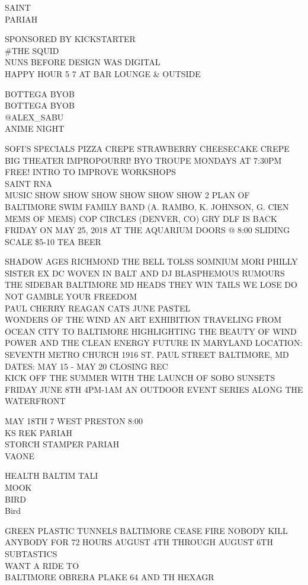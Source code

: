 \documentclass[10pt,letterpaper]{article}
\begin{document}
SAINT\\
PARIAH

SPONSORED BY KICKSTARTER\\
\#THE SQUID\\
NUNS BEFORE DESIGN WAS DIGITAL\\
HAPPY HOUR 5 7 AT BAR LOUNGE \& OUTSIDE

BOTTEGA BYOB\\
BOTTEGA BYOB\\
@ALEX\_SABU\\
ANIME NIGHT

SOFI'S SPECIALS PIZZA CREPE STRAWBERRY CHEESECAKE CREPE\\
BIG THEATER IMPROPOURRI! BYO TROUPE MONDAYS AT 7:30PM FREE! INTRO TO IMPROVE WORKSHOPS\\
SAINT RNA\\
MUSIC SHOW SHOW SHOW SHOW SHOW SHOW 2 PLAN OF BALTIMORE SWIM FAMILY BAND (A. RAMBO, K. JOHNSON, G. CIEN MEMS OF MEMS) COP CIRCLES (DENVER, CO) GRY DLF IS BACK FRIDAY ON MAY 25, 2018 AT THE AQUARIUM DOORS @ 8:00 SLIDING SCALE \$5{-}10 TEA BEER

SHADOW AGES RICHMOND THE BELL TOLSS SOMNIUM MORI PHILLY SISTER EX DC WOVEN IN BALT AND DJ BLASPHEMOUS RUMOURS THE SIDEBAR BALTIMORE MD HEADS THEY WIN TAILS WE LOSE DO NOT GAMBLE YOUR FREEDOM\\
PAUL CHERRY REAGAN CATS JUNE PASTEL\\
WONDERS OF THE WIND AN ART EXHIBITION TRAVELING FROM OCEAN CITY TO BALTIMORE HIGHLIGHTING THE BEAUTY OF WIND POWER AND THE CLEAN ENERGY FUTURE IN MARYLAND LOCATION: SEVENTH METRO CHURCH 1916 ST. PAUL STREET BALTIMORE, MD DATES: MAY 15 {-} MAY 20 CLOSING REC\\
KICK OFF THE SUMMER WITH THE LAUNCH OF SOBO SUNSETS FRIDAY JUNE 8TH 4PM{-}1AM AN OUTDOOR EVENT SERIES ALONG THE WATERFRONT

MAY 18TH 7 WEST PRESTON 8:00\\
KS REK PARIAH\\
STORCH STAMPER PARIAH\\
VAONE

HEALTH BALTIM TALI\\
MOOK\\
BIRD\\
Bird

GREEN PLASTIC TUNNELS BALTIMORE CEASE FIRE NOBODY KILL ANYBODY FOR 72 HOURS AUGUST 4TH THROUGH AUGUST 6TH\\
SUBTASTICS\\
WANT A RIDE TO\\
BALTIMORE OBRERA PLAKE 64 AND TH HEXAGR
\end{document}
